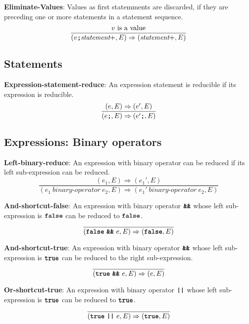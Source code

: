 \vspace{10mm}
\textbf{Eliminate-Values}: Values as first statemments are discarded, if
they are preceding one or more statements in a statement sequence.
\[
\frac{
v \ \mbox{is a value}  
}{
(v \textbf{\texttt{;}} \textit{statement}+, E)
   \Rightarrow 
  ( \textit{statement}+, E)
}
\]

\subsection*{Statements}

\textbf{Expression-statement-reduce}: An expression statement
is reducible if its expression is reducible.
\[
\frac{
  (e,E) \Rightarrow (e',E)
}{  
  (e \textbf{\texttt{;}}, E)
  \Rightarrow 
  (e' \textbf{\texttt{;}}, E)
}
\]

\subsection*{Expressions: Binary operators}

\textbf{Left-binary-reduce}: An expression with binary operator
can be reduced if its left sub-expression can be reduced.
\[
\frac{
  ( e_1 , E ) \Rightarrow (e_1', E)
}{
  (e_1\  \textit{binary-operator} \ e_2, E)
  \Rightarrow
  (e_1'\  \textit{binary-operator} \ e_2, E)
}
\]


\vspace{10mm}
\textbf{And-shortcut-false}: An expression with binary operator
$\textbf{\texttt{\&\&}}$ whose left sub-expression is
$\textbf{\texttt{false}}$ can be reduced to
$\textbf{\texttt{false}}$.
\[
\frac{
}{
  (\textbf{\texttt{false}}\  \textbf{\texttt{\&\&}}\ e, E)
  \Rightarrow
  (\textbf{\texttt{false}}, E)
}
\]

\vspace{10mm}
\textbf{And-shortcut-true}: An expression with binary operator
$\textbf{\texttt{\&\&}}$ whose left sub-expression is
$\textbf{\texttt{true}}$ can be reduced to
the right sub-expression.
\[
\frac{
}{
  (\textbf{\texttt{true}}\  \textbf{\texttt{\&\&}}\ e, E)
  \Rightarrow
  (e, E)
}
\]

\vspace{10mm}
\textbf{Or-shortcut-true}: An expression with binary operator
$\textbf{\texttt{||}}$ whose left sub-expression is
$\textbf{\texttt{true}}$ can be reduced to
$\textbf{\texttt{true}}$.
\[
\frac{
}{
  (\textbf{\texttt{true}}\  \textbf{\texttt{||}}\ e, E)
  \Rightarrow
  (\textbf{\texttt{true}}, E)
}
\]

